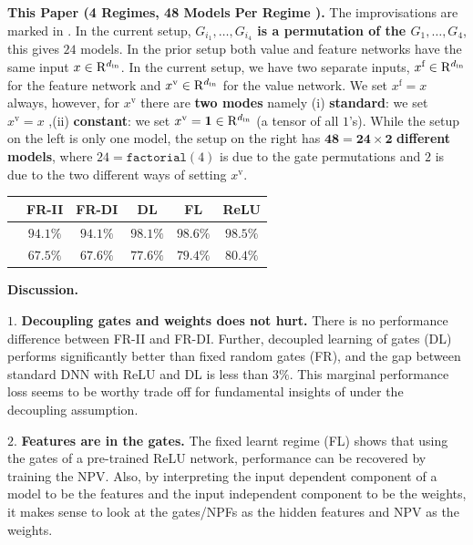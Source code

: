 \textbf{This Paper (4 Regimes, 48 Models Per Regime ).} The improvisations are marked in {\color{red}{red}}.  In the current setup, {\bf{$G_{i_1},\ldots,G_{i_4}$ is a permutation of the $G_1,\ldots,G_4$}}, this gives $24$ models. In the prior setup both value and feature networks have the same input $x\in\mathrm{R}^{d_{\text{in}}}$. In the current setup, we have two separate inputs, $x^{\text{f}}\in\mathrm{R}^{d_{\text{in}}}$ for the feature network and $x^{\text{v}}\in\mathrm{R}^{d_{\text{in}}}$ for the value network. We set $x^{\text{f}}=x$ always, however, for $x^{\text{v}}$ there are \textbf{two modes} namely (i) \textbf{standard}: we set $x^{\text{v}}=x$ ,(ii) \textbf{constant}: we set $x^{\text{v}}=\mathbf{1}\in\mathrm{R}^{d_{\text{in}}}$ (a tensor of all $1$'s). While the setup on the left is only one model, the setup on the right has $\mathbf{48=24\times 2}$ \textbf{different models}, where $24=\texttt{factorial}(4)$ is due to the gate permutations and $2$ is due to the two different ways of setting $x^{\text{v}}$.






\begin{tabular}{|p{1.75cm}|c|c|c|c|c|}\hline
& FR-II &FR-DI & DL& FL& ReLU\\\hline
\centering{FC (MNIST)} &$94.1\%$  &$94.1\%$  &$98.1\%$ &$98.6\%$ &$98.5\%$\\\hline
\centering{CNN (CIFAR-10)}&$67.5\%$ &$67.6\%$   &$77.6\%$ &$79.4\%$ &$80.4\%$\\\hline
\end{tabular}


\textbf{Discussion.}

\indent\quad $1.$ \textbf{Decoupling gates and weights does not hurt.} There is no performance difference between FR-II and FR-DI.  Further, decoupled learning of gates (DL) performs significantly better than fixed random gates (FR), and the gap between standard DNN with ReLU and DL is less than $3\%$. This marginal performance loss seems to be worthy trade off for fundamental insights of  under the decoupling assumption.

\indent\quad $2.$ \textbf{Features are in the gates.} The fixed learnt regime (FL) shows that using the gates of a pre-trained ReLU network, performance can be recovered by training the NPV. Also, by interpreting the input dependent component of a model to be the features and the input independent component to be the weights, it makes sense to look at the gates/NPFs as the hidden features and NPV as the weights.%


